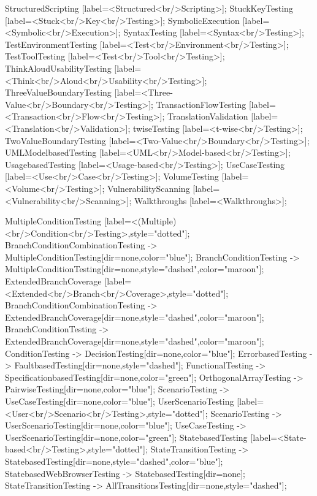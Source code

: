 \documentclass{article}
\begin{document}
{StructuredScripting [label=<Structured<br/>Scripting>];
StuckKeyTesting [label=<Stuck<br/>Key<br/>Testing>];
SymbolicExecution [label=<Symbolic<br/>Execution>];
SyntaxTesting [label=<Syntax<br/>Testing>];
TestEnvironmentTesting [label=<Test<br/>Environment<br/>Testing>];
TestToolTesting [label=<Test<br/>Tool<br/>Testing>];
ThinkAloudUsabilityTesting [label=<Think<br/>Aloud<br/>Usability<br/>Testing>];
ThreeValueBoundaryTesting [label=<Three-Value<br/>Boundary<br/>Testing>];
TransactionFlowTesting [label=<Transaction<br/>Flow<br/>Testing>];
TranslationValidation [label=<Translation<br/>Validation>];
twiseTesting [label=<t-wise<br/>Testing>];
TwoValueBoundaryTesting [label=<Two-Value<br/>Boundary<br/>Testing>];
UMLModelbasedTesting [label=<UML<br/>Model-based<br/>Testing>];
UsagebasedTesting [label=<Usage-based<br/>Testing>];
UseCaseTesting [label=<Use<br/>Case<br/>Testing>];
VolumeTesting [label=<Volume<br/>Testing>];
VulnerabilityScanning [label=<Vulnerability<br/>Scanning>];
Walkthroughs [label=<Walkthroughs>];

MultipleConditionTesting [label=<(Multiple)<br/>Condition<br/>Testing>,style="dotted"];
BranchConditionCombinationTesting -> MultipleConditionTesting[dir=none,color="blue"];
BranchConditionTesting -> MultipleConditionTesting[dir=none,style="dashed",color="maroon"];
ExtendedBranchCoverage [label=<Extended<br/>Branch<br/>Coverage>,style="dotted"];
BranchConditionCombinationTesting -> ExtendedBranchCoverage[dir=none,style="dashed",color="maroon"];
BranchConditionTesting -> ExtendedBranchCoverage[dir=none,style="dashed",color="maroon"];
ConditionTesting -> DecisionTesting[dir=none,color="blue"];
ErrorbasedTesting -> FaultbasedTesting[dir=none,style="dashed"];
FunctionalTesting -> SpecificationbasedTesting[dir=none,color="green"];
OrthogonalArrayTesting -> PairwiseTesting[dir=none,color="blue"];
ScenarioTesting -> UseCaseTesting[dir=none,color="blue"];
UserScenarioTesting [label=<User<br/>Scenario<br/>Testing>,style="dotted"];
ScenarioTesting -> UserScenarioTesting[dir=none,color="blue"];
UseCaseTesting -> UserScenarioTesting[dir=none,color="green"];
StatebasedTesting [label=<State-based<br/>Testing>,style="dotted"];
StateTransitionTesting -> StatebasedTesting[dir=none,style="dashed",color="blue"];
StatebasedWebBrowserTesting -> StatebasedTesting[dir=none];
StateTransitionTesting -> AllTransitionsTesting[dir=none,style="dashed"];

}
\end{document}
